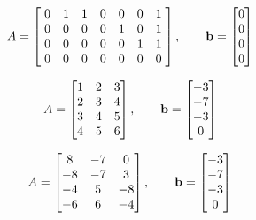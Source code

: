 \begin{oppgave}
\begin{punkt}
\vspace{-10pt}
$$A=
\begin{bmatrix}
\;0 & 1 & 1 & 0 & 0 & 0 & 1\;\\
\;0 & 0 & 0 & 0 & 1 & 0 & 1\;\\
\;0 & 0 & 0 & 0 & 0 & 1 & 1\;\\
\;0 & 0 & 0 & 0 & 0 & 0 & 0\;
\end{bmatrix},
\qquad
\mathbf{b}=
\begin{bmatrix}
0  \\
0 \\
0 \\
0
\end{bmatrix}
$$
\end{punkt}

\begin{punkt}
\vspace{-10pt}
$$A=
\begin{bmatrix}
1 & 2 & 3\\
2 & 3 & 4\\
3 & 4 & 5\\
4 & 5 & 6
\end{bmatrix},
\qquad
\mathbf{b}=
\begin{bmatrix}
-3  \\
-7 \\
-3 \\
0
\end{bmatrix}
$$
\end{punkt}


\begin{punkt}
\vspace{-10pt}
	$$A=
	\begin{bmatrix}
	8  & -7 & 0 \\
	-8 & -7 & 3 \\
	-4 & 5  & -8\\
	-6 & 6  & -4
	\end{bmatrix},
\qquad
        \mathbf{b}=
	\begin{bmatrix}
	-3  \\
	-7 \\
	-3 \\
	0
	\end{bmatrix}
	$$
	
\end{punkt}

\end{oppgave}

